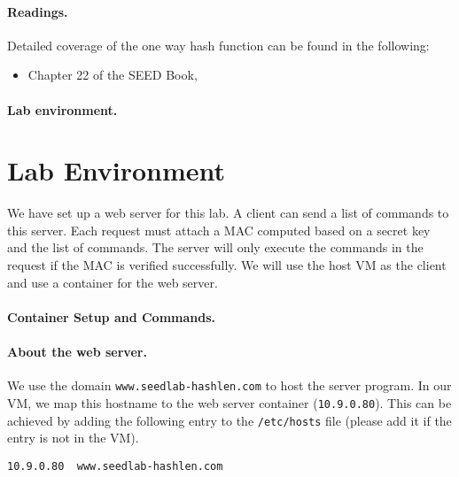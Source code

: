 \paragraph{Readings.} Detailed coverage of the one way hash function can be
found in the following:

\begin{itemize}
\item Chapter 22 of the SEED Book, \seedbook
\end{itemize}


\paragraph{Lab environment.}
\seedenvironmentB
\nodependency




\section{Lab Environment}

We have set up a web server for this lab.
A client can send a list of commands to this server.
Each request must attach a MAC computed based on a secret
key and the list of commands. The server will
only execute the commands in the request if
the MAC is verified successfully.
We will use the host VM as the client and use
a container for the web server.


\paragraph{Container Setup and Commands.}




\paragraph{About the web server.}
We use the domain \texttt{www.seedlab-hashlen.com} to host the server program.
In our VM, we map this hostname to
the web server container (\texttt{10.9.0.80}). This can be
achieved by adding the following entry to the
\texttt{/etc/hosts} file (please add it if the entry is not
in the VM).

\begin{lstlisting}
10.9.0.80  www.seedlab-hashlen.com
\end{lstlisting}


